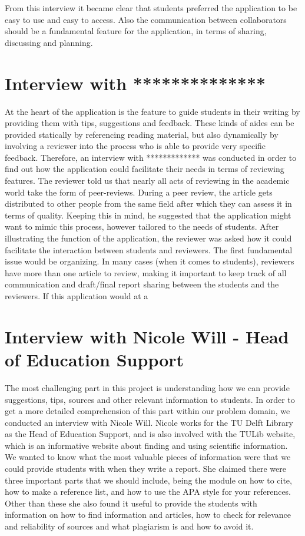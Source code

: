 From this interview it became clear that students preferred the application to be easy to use and easy to access. Also the communication between collaborators should be a fundamental feature for the application, in terms of sharing, discussing and planning. 

\section{Interview with **************}
At the heart of the application is the feature to guide students in their writing by providing them with tips, suggestions and feedback. These kinds of aides can be provided statically by referencing reading material, but also dynamically by involving a reviewer into the process who is able to provide very specific feedback. Therefore, an interview with ************* was conducted in order to find out how the application could facilitate their needs in terms of reviewing features. The reviewer told us that nearly all acts of reviewing in the academic world take the form of peer-reviews. During a peer review, the article gets distributed to other people from the same field after which they can assess it in terms of quality. Keeping this in mind, he suggested that the application might want to mimic this process, however tailored to the needs of students.
After illustrating the function of the application, the reviewer was asked how it could facilitate the interaction between students and reviewers. The first fundamental issue would be organizing. In many cases (when it comes to students), reviewers have more than one article to review, making it important to keep track of all communication and draft/final report sharing between the students and the reviewers. If this application would at a 


\section{Interview with Nicole Will - Head of Education Support}
 The most challenging part in this project is understanding how we can provide suggestions, tips, sources and other relevant information to students. In order to get a more detailed comprehension of this part within our problem domain, we conducted an interview with Nicole Will. Nicole works for the TU Delft Library as the Head of Education Support, and is also involved with the TULib website, which is an informative website about finding and using scientific information.
We wanted to know what the most valuable pieces of information were that we could provide students with when they write a report. She claimed there were three important parts that we should include, being the module on how to cite\cite{tulib:howtocite}, how to make a reference list, and how to use the APA\cite{tulib:apa} style for your references.
Other than these she also found it useful to provide the students with information on how to find information and articles, how to check for relevance and reliability of sources and what plagiarism is and how to avoid it.